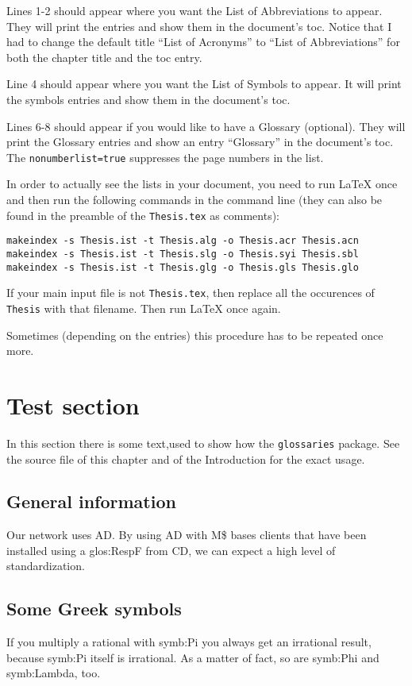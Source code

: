 Lines 1-2 should appear where you want the List of Abbreviations to appear. They will print the entries and show them in the document's \gls{toc}. Notice that I had to change the default title ``List of Acronyms'' to ``List of Abbreviations'' for both the chapter title and the \gls{toc} entry.

Line 4 should appear where you want the List of Symbols to appear. It will print the symbols entries and show them in the document's \gls{toc}.

Lines 6-8 should appear if you would like to have a Glossary (optional). They will print the Glossary entries and show an entry ``Glossary'' in the document's \gls{toc}. The \texttt{nonumberlist=true} suppresses the page numbers in the list.

In order to actually see the lists in your document, you need to run LaTeX once and then run the following commands in the command line (they can also be found in the preamble of the \texttt{Thesis.tex} as comments):
\begin{lstlisting}
makeindex -s Thesis.ist -t Thesis.alg -o Thesis.acr Thesis.acn
makeindex -s Thesis.ist -t Thesis.slg -o Thesis.syi Thesis.sbl
makeindex -s Thesis.ist -t Thesis.glg -o Thesis.gls Thesis.glo
\end{lstlisting}
If your main input file is not \texttt{Thesis.tex}, then replace all the occurences of \texttt{Thesis} with that filename. Then run LaTeX once again.

Sometimes (depending on the entries) this procedure has to be repeated once more.

\section{Test section}
In this section there is some text,used to show how the \texttt{glossaries} package. See the source file of this chapter and of the Introduction for the exact usage. 

\subsection{General information}
Our network uses \gls{AD}. By using \gls{AD} with \gls{M$} bases clients that
have been installed using a \gls{glos:RespF} from \gls{CD}, we can expect a 
high level of standardization.

\subsection{Some Greek symbols}
If you multiply a rational with \gls{symb:Pi} you always get an irrational result, because 
\gls{symb:Pi} itself is irrational. As a matter of fact, so are \gls{symb:Phi} 
and \gls{symb:Lambda}, too.



